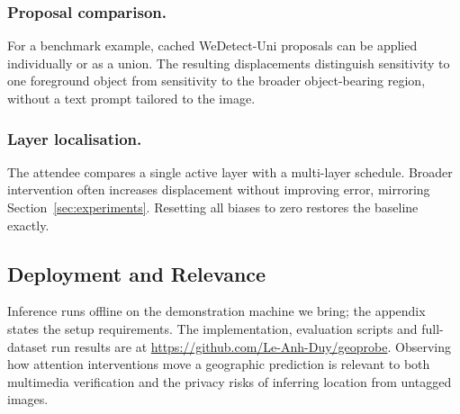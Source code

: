 \subsubsection{Proposal comparison.}
For a benchmark example, cached WeDetect-Uni proposals can be applied
individually or as a union. The resulting displacements distinguish sensitivity
to one foreground object from sensitivity to the broader object-bearing region,
without a text prompt tailored to the image.

\subsubsection{Layer localisation.}
The attendee compares a single active layer with a multi-layer schedule.
Broader intervention often increases displacement without improving error,
mirroring Section~\ref{sec:experiments}. Resetting all biases to zero restores
the baseline exactly.

\subsection{Deployment and Relevance}

Inference runs offline on the demonstration machine we bring; the appendix
states the setup requirements. The implementation, evaluation scripts and
full-dataset run results are at
\url{https://github.com/Le-Anh-Duy/geoprobe}. Observing how attention
interventions move a geographic prediction is relevant to both multimedia
verification and the privacy risks of inferring location from untagged images.
